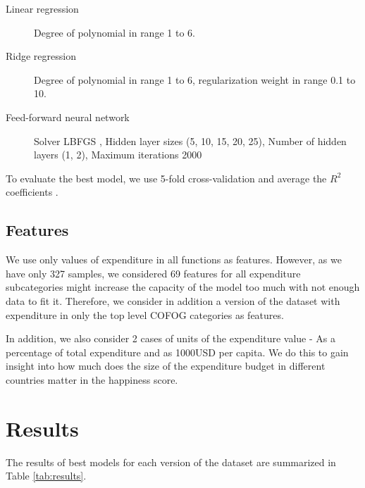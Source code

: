 \documentclass{article}
\begin{document}
\begin{description}
   \item [Linear regression] Degree of polynomial in range 1 to 6.
   \item [Ridge regression] Degree of polynomial in range 1 to 6, regularization weight in range 0.1 to 10.
   \item [Feed-forward neural network] Solver LBFGS \cite{lbfgs}, Hidden layer sizes (5, 10, 15, 20, 25), Number of hidden layers (1, 2), Maximum iterations 2000
\end{description}

To evaluate the best model, we use 5-fold cross-validation and average the \(R^2\) coefficients \cite{r2}.
\subsection{Features}
We use only values of expenditure in all functions as features. However, as we have only 327 samples, we considered 69 features for all expenditure subcategories might increase the capacity of the model too much with not enough data to fit it. Therefore, we consider in addition a version of the dataset with expenditure in only the top level COFOG categories as features.

In addition, we also consider 2 cases of units of the expenditure value - As a percentage of total expenditure and as 1000USD per capita. We do this to gain insight into how much does the size of the expenditure budget in different countries matter in the happiness score.

\section{Results}
The results of best models for each version of the dataset are summarized in Table \ref{tab:results}.
\end{document}

